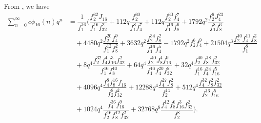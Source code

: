 \documentclass[12pt]{article}
\numberwithin{equation}{section}
\theoremstyle{plain}
\numberwithin{theorem}{section}
\theoremstyle{definition}
\theoremstyle{remark}
\begin{document}
	From \cite[Theorem 3.12]{CGT25}, we have
	\begin{align}
		\sum_{n=0}^{\infty}c\phi_{16}(n)q^n&=\dfrac{1}{f^{16}_{1}} \bigg (\dfrac{f_2^{32}J_{16}}{f_1^{16}f_{32}^2} +112q\dfrac{f_2^{30}}{f_1^8f_4^7} +112q\dfrac{f_2^{30}f_4^7}{f_1^{16}f_8^6} +1792q^2\dfrac{f_2^6J_4^{23}}{f_1^8f_8^6}\nonumber \\&\quad +4480q^2\dfrac{f_2^{20}f_4^9}{f_1^{12}f_8^2} +3632q^2\dfrac{f_2^{34}f_8^2}{f_1^{16}f_4^5}-1792q^2f_2^6f_4^9+21504q^3\dfrac{f_2^{10}f_4^{11}f_8^2}{f_1^8}\nonumber \\&\quad  +8q^4\dfrac{f_2^{32}f_4^4f_{16}^3f_{32}^2}{f_1^{16}f_8^{10}} +64q^4\dfrac{f_2^{40}J_8^4f_{16}^9}{f_1^{16}f_4^{20}f_{32}^2}+32q^4\dfrac{f_2^{40}f_8^{18}f_{32}^2}{f_1^{16}f_4^{24}f_{16}^5}\nonumber \\&\quad  +4096q^4\dfrac{f_4^8f_8^{16}f_{16}}{f_2^8f_{32}^2} +12288q^4\dfrac{f_4^{27}f_8^2}{f_2^{14}}+512q^4\dfrac{f_4^{32}f_8^2f_{32}^2}{f_2^{16}f_{16}^5}\nonumber \\&\quad +1024q^4\dfrac{f_4^{36}f_{16}^9}{f_2^{16}f_8^{12}f_{32}^2}+32768q^8\dfrac{f_4^{12}f_8^6f_{16}^3f_{32}^2}{f_2^8}\bigg ).\label{gen_c_phi_16}
	\end{align}
\end{document}
